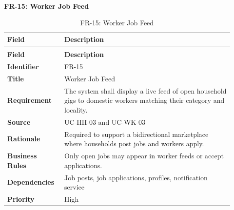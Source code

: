 \documentclass[12pt,a4paper]{article}
\begin{document}
\noindent\textbf{FR-15: Worker Job Feed}\par
\vspace{4pt}
\begingroup\small\setlength{\tabcolsep}{4pt}\renewcommand{\arraystretch}{1.15}
\begin{longtable}{|>{\raggedright\arraybackslash}p{0.22\linewidth}|>{\raggedright\arraybackslash}p{0.70\linewidth}|}
\caption{FR-15: Worker Job Feed}\label{tab:fr-15}\\
\hline
\textbf{Field} & \textbf{Description} \\ \hline
\endfirsthead
\multicolumn{2}{c}{Table \thetable\ Worker Job Feed (continued)}\\
\hline
\textbf{Field} & \textbf{Description} \\ \hline
\endhead
\textbf{Identifier} & FR-15 \\ \hline
\textbf{Title} & Worker Job Feed \\ \hline
\textbf{Requirement} & The system shall display a live feed of open household gigs to domestic workers matching their category and locality. \\ \hline
\textbf{Source} & UC-HH-03 and UC-WK-03 \\ \hline
\textbf{Rationale} & Required to support a bidirectional marketplace where households post jobs and workers apply. \\ \hline
\textbf{Business Rules} & Only open jobs may appear in worker feeds or accept applications. \\ \hline
\textbf{Dependencies} & Job posts, job applications, profiles, notification service \\ \hline
\textbf{Priority} & High \\ \hline
\end{longtable}
\endgroup
\end{document}

